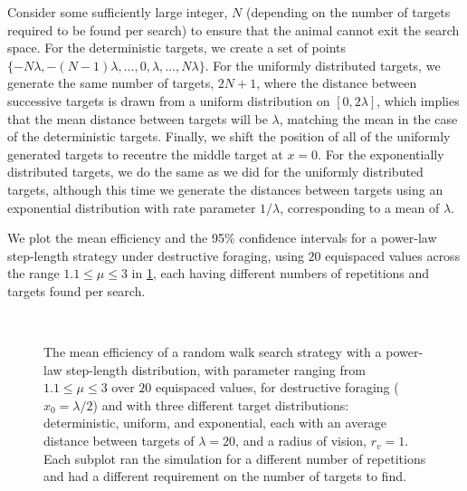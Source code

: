 Consider some sufficiently large integer, $N$ (depending on the number of targets required to be found per search) to ensure that the animal cannot exit the search space. For the deterministic targets, we create a set of points $\{-N \lambda, -(N-1)\lambda, \dots, 0, \lambda, \dots, N\lambda \}$. For the uniformly distributed targets, we generate the same number of targets, $2N+1$, where the distance between successive targets is drawn from a uniform distribution on $[0,2\lambda]$, which implies that the mean distance between targets will be $\lambda$, matching the mean in the case of the deterministic targets. Finally, we shift the position of all of the uniformly generated targets to recentre the middle target at $x=0$. For the exponentially distributed targets, we do the same as we did for the uniformly distributed targets, although this time we generate the distances between targets using an exponential distribution with rate parameter $1/\lambda$, corresponding to a mean of $\lambda$.

We plot the mean efficiency and the 95\% confidence intervals for a power-law step-length strategy under destructive foraging, using $20$ equispaced values across the range $1.1\leq \mu \leq 3$ in \cref{fig:EffectOfTargetDist1D_PowerLaw_D}, each having different numbers of repetitions and targets found per search.

\begin{figure}[h!]
	\centering
	\hfill
	\\
	\hfill
	\caption[Mean efficiency of an unbounded power-law strategy for three different target distributions for a different numbers of repetitions and targets to be found]{The mean efficiency of a random walk search strategy with a power-law step-length distribution, with parameter ranging from $1.1 \leq \mu \leq 3$ over $20$ equispaced values, for destructive foraging ($x_0=\lambda/2$) and with three different target distributions: deterministic, uniform, and exponential, each with an average distance between targets of $\lambda = 20$, and a radius of vision, $r_v=1$. Each subplot ran the simulation for a different number of repetitions and had a different requirement on the number of targets to find.}\label{fig:EffectOfTargetDist1D_PowerLaw_D}
\end{figure}

